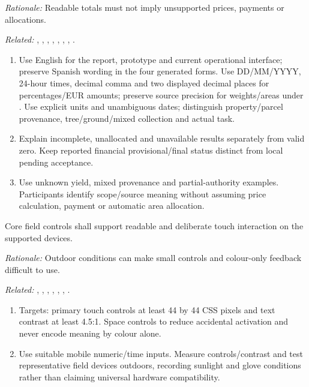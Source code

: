 \textit{Rationale:} Readable totals must not imply unsupported prices, payments or allocations.

\textit{Related:} \hyperref[fr:049]{}, \hyperref[fr:051]{}, \hyperref[fr:053]{}, \hyperref[fr:055]{}, \hyperref[fr:056]{}, \hyperref[fr:058]{}, \hyperref[fr:059]{}, \hyperref[fr:060]{}.
\begin{enumerate}[label=(\alph*),leftmargin=*,itemsep=1pt,topsep=3pt]
\item Use English for the report, prototype and current operational interface; preserve Spanish wording in the four generated forms. Use DD/MM/YYYY, 24-hour times, decimal comma and two displayed decimal places for percentages/EUR amounts; preserve source precision for weights/areas under . Use explicit units and unambiguous dates; distinguish property/parcel provenance, tree/ground/mixed collection and actual task.
\item Explain incomplete, unallocated and unavailable results separately from valid zero. Keep reported financial provisional/final status distinct from local pending acceptance.
\item Use unknown yield, mixed provenance and partial-authority examples. Participants identify scope/source meaning without assuming price calculation, payment or automatic area allocation.
\end{enumerate}

\label{nfr:USA-07}
Core field controls shall support readable and deliberate touch interaction on the supported devices.

\textit{Rationale:} Outdoor conditions can make small controls and colour-only feedback difficult to use.

\textit{Related:} \hyperref[fr:028]{}, \hyperref[fr:030]{}, \hyperref[fr:031]{}, \hyperref[fr:038]{}, \hyperref[fr:042]{}, \hyperref[fr:046]{}, \hyperref[fr:049]{}.
\begin{enumerate}[label=(\alph*),leftmargin=*,itemsep=1pt,topsep=3pt]
\item Targets: primary touch controls at least 44 by 44 CSS pixels and text contrast at least 4.5:1. Space controls to reduce accidental activation and never encode meaning by colour alone.
\item Use suitable mobile numeric/time inputs. Measure controls/contrast and test representative field devices outdoors, recording sunlight and glove conditions rather than claiming universal hardware compatibility.
\end{enumerate}

